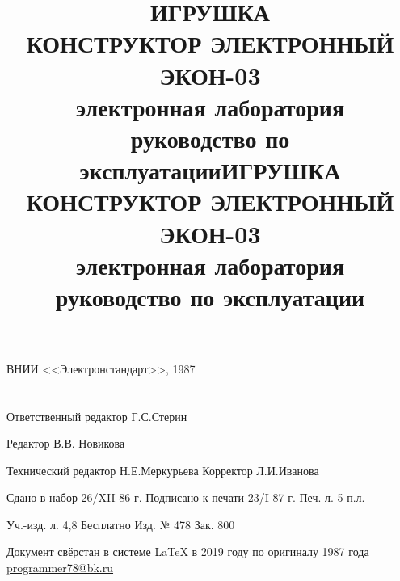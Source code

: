 \documentclass[12pt]{article}
\date{}
\author{}
\begin{document}
\title{\vspace{5em}ИГРУШКА\\
\vspace{2em}КОНСТРУКТОР ЭЛЕКТРОННЫЙ\\
ЭКОН-03\\
электронная лаборатория\\
руководство по эксплуатации}\maketitle 
\pagestyle{empty} %
\thispagestyle{empty}

\clearpage\mbox{}\clearpage
\newpage

\title{\vspace{5em}ИГРУШКА\\
\vspace{2em}КОНСТРУКТОР ЭЛЕКТРОННЫЙ\\
ЭКОН-03\\
электронная лаборатория\\
руководство по эксплуатации}\maketitle 
\pagestyle{empty} %
\thispagestyle{empty}
\newpage
\vspace*{360px}
\textsuperscript{\textcopyright} ВНИИ <<Электронстандарт>>, 1987
\\
\\
\\
Ответственный редактор Г.С.Стерин

Редактор В.В. Новикова

Технический редактор Н.Е.Меркурьева Корректор Л.И.Иванова

\hrulefill

{\small
Сдано в набор 26/XII-86 г. \hspace{1em} Подписано к печати 23/I-87 г. \hspace{1em} Печ. л. 5 п.л.

Уч.-изд. л. 4,8 \hspace{1em} Бесплатно \hspace{4em} Изд. № 478 \hspace{8em} Зак. 800}

\hrulefill

Документ свёрстан в системе \LaTeX{} в 2019 году по оригиналу 1987 года \href{https://vk.com/programmer78}{programmer78@bk.ru}

\newpage
\pagestyle{plain} %
\setcounter{page}{3} %
\vspace*{7em}
\end{document}
